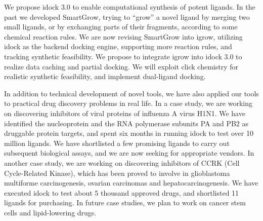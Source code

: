 We propose idock 3.0 to enable computational synthesis of potent ligands. In the past we developed SmartGrow, trying to ``grow'' a novel ligand by merging two small ligands, or by exchanging parts of their fragments, according to some chemical reaction rules. We are now revising SmartGrow into igrow, utilizing idock as the backend docking engine, supporting more reaction rules, and tracking synthetic feasibility. We propose to integrate igrow into idock 3.0 to realize data caching and partial docking. We will exploit click chemistry for realistic synthetic feasibility, and implement dual-ligand docking.

In addition to technical development of novel tools, we have also applied our tools to practical drug discovery problems in real life. In a case study, we are working on discovering inhibitors of viral proteins of influenza A virus H1N1. We have identified the nucleoprotein and the RNA polymerase subunits PA and PB2 as druggable protein targets, and spent six months in running idock to test over 10 million ligands. We have shortlisted a few promising ligands to carry out subsequent biological assays, and we are now seeking for appropriate vendors. In another case study, we are working on discovering inhibitors of CCRK (Cell Cycle-Related Kinase), which has been proved to involve in glioblastoma multiforme carcinogenesis, ovarian carcinomas and hepatocarcinogenesis. We have executed idock to test about 5 thousand approved drugs, and shortlisted 11 ligands for purchasing. In future case studies, we plan to work on cancer stem cells and lipid-lowering drugs.
